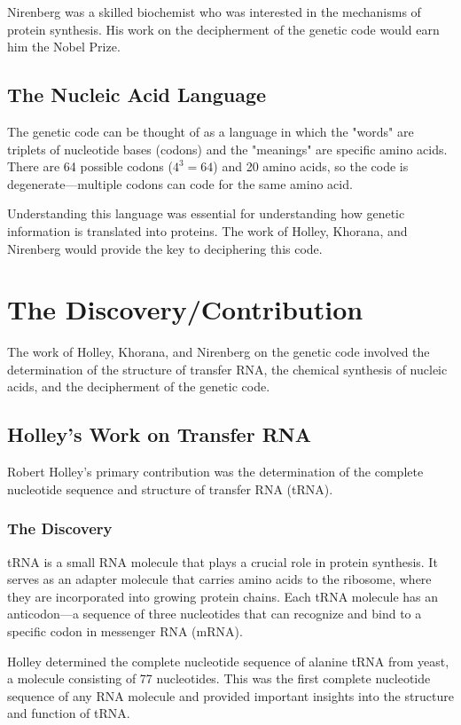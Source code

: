 Nirenberg was a skilled biochemist who was interested in the mechanisms of protein synthesis. His work on the decipherment of the genetic code would earn him the Nobel Prize.

\subsection{The Nucleic Acid Language}

The genetic code can be thought of as a language in which the "words" are triplets of nucleotide bases (codons) and the "meanings" are specific amino acids. There are 64 possible codons ($4^3 = 64$) and 20 amino acids, so the code is degenerate---multiple codons can code for the same amino acid.

Understanding this language was essential for understanding how genetic information is translated into proteins. The work of Holley, Khorana, and Nirenberg would provide the key to deciphering this code.

\section{The Discovery/Contribution}

The work of Holley, Khorana, and Nirenberg on the genetic code involved the determination of the structure of transfer RNA, the chemical synthesis of nucleic acids, and the decipherment of the genetic code.

\subsection{Holley's Work on Transfer RNA}

Robert Holley's primary contribution was the determination of the complete nucleotide sequence and structure of transfer RNA (tRNA).

\subsubsection{The Discovery}

tRNA is a small RNA molecule that plays a crucial role in protein synthesis. It serves as an adapter molecule that carries amino acids to the ribosome, where they are incorporated into growing protein chains. Each tRNA molecule has an anticodon---a sequence of three nucleotides that can recognize and bind to a specific codon in messenger RNA (mRNA).

Holley determined the complete nucleotide sequence of alanine tRNA from yeast, a molecule consisting of 77 nucleotides. This was the first complete nucleotide sequence of any RNA molecule and provided important insights into the structure and function of tRNA.

